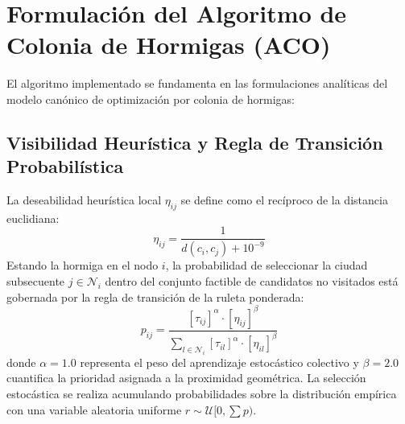 \documentclass[11pt,a4paper]{article}
\begin{document}
\section{Formulación del Algoritmo de Colonia de Hormigas (ACO)}

El algoritmo implementado se fundamenta en las formulaciones analíticas del modelo canónico de optimización por colonia de hormigas:

\subsection{Visibilidad Heurística y Regla de Transición Probabilística}
La deseabilidad heurística local $\eta_{ij}$ se define como el recíproco de la distancia euclidiana:
\begin{equation}
    \eta_{ij} = \frac{1}{d(c_i, c_j) + 10^{-9}}
\end{equation}
Estando la hormiga en el nodo $i$, la probabilidad de seleccionar la ciudad subsecuente $j \in \mathcal{N}_i$ dentro del conjunto factible de candidatos no visitados está gobernada por la regla de transición de la ruleta ponderada:
\begin{equation}
    p_{ij} = \frac{\left[\tau_{ij}\right]^\alpha \cdot \left[\eta_{ij}\right]^\beta}{\sum_{l \in \mathcal{N}_i} \left[\tau_{il}\right]^\alpha \cdot \left[\eta_{il}\right]^\beta}
\end{equation}
donde $\alpha = 1.0$ representa el peso del aprendizaje estocástico colectivo y $\beta = 2.0$ cuantifica la prioridad asignada a la proximidad geométrica. La selección estocástica se realiza acumulando probabilidades sobre la distribución empírica con una variable aleatoria uniforme $r \sim \mathcal{U}[0, \sum p)$.
\end{document}
